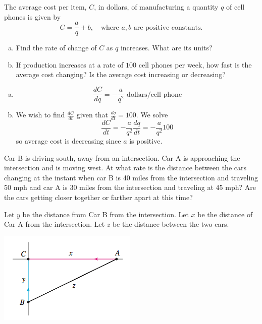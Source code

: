 \documentclass[11pt]{exam}
\begin{document}
\begin{questions}
  \question The average cost per item, \(C\), in dollars, of
    manufacturing a quantity \(q\) of cell phones is given by \[
      C = \frac{a}{q}  + b, \quad \text{where }a,b\text{ are positive constants.}
    \]
    \begin{enumerate}[(a)]
    \item Find the rate of change of \(C\) as \(q\) increases. What
      are its units?
    \item If production increases at a rate of \(100\) cell phones per
      week, how fast is the average cost changing? Is the average cost
      increasing or decreasing?
    \end{enumerate}
    \begin{solution}
      \begin{enumerate}[(a)]
      \item \[
          \frac{dC}{dq} = -\frac{a}{q^2} \text{ dollars/cell phone}
        \]
      \item We wish to find \(\frac{dC}{dt}\) given that
        \(\frac{dq}{dt} = 100\). We solve \[
          \frac{dC}{dt} = -\frac{a}{q^2} \frac{dq}{dt} =
          -\frac{a}{q^2}100
        \]
        so average cost is decreasing since \(a\) is positive.
      \end{enumerate}
    \end{solution}
  \question Car B is driving south, away from an intersection.  Car A is approaching the intersection and is moving west.  At what rate is the distance between the cars changing at the instant when car B is 40 miles from the intersection and traveling 50 mph and car A is 30 miles from the intersection and traveling at 45 mph?  Are the cars getting closer together or farther apart at this time?
    \begin{solution}
      Let \(y\) be the distance from Car B from the intersection. Let
      \(x\) be the distance of Car A from the intersection. Let \(z\)
      be the distance between the two cars.
      \begin{center}
        \includegraphics[scale=0.7]{cars-at-intersection}
      \end{center}

\end{solution}
\end{questions}
\end{document}
